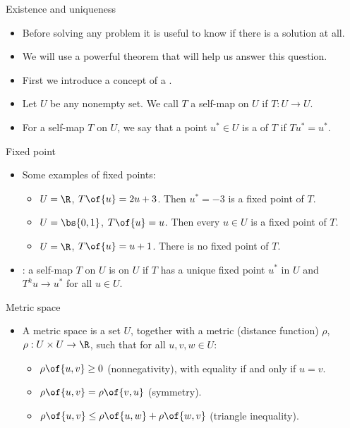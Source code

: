 \documentclass[11pt,xcolor={dvipsnames},aspectratio=159,hyperref={pdftex,pdfpagemode=UseNone,hidelinks,pdfdisplaydoctitle=true},usepdftitle=false]{beamer}
\begin{document}
\begin{frame}
\end{frame}


\begin{frame}{Existence and uniqueness}
    \begin{itemize}
        \item Before solving any problem it is useful to know if there is a solution at all.
        \item We will use a powerful theorem that will help us answer this question. 
        \item First we introduce a concept of a .
        \item Let $U$ be any nonempty set. We call $T$ a self-map on $U$ if $T: U \to U$.
        \item For a self-map $T$ on $U$, we say that a point $u^*\in U$ is a  of $T$ if $Tu^* = u^*$.
    \end{itemize}
\end{frame}

\begin{frame}{Fixed point}
    \begin{itemize}
        \item Some examples of fixed points: 
        \begin{itemize}
        \item  $U = \R$, $T\of{u} = 2u + 3$. Then $u^* = -3$ is a fixed point of $T$.
        \item  $U = \bs{0,1}$, $T\of{u} = u$. Then every $u \in U$ is a fixed point of $T$.    
        \item  $U = \R$, $T\of{u} = u + 1$. There is no fixed point of $T$.
        \end{itemize}
        \item {}: a self-map $T$ on $U$ is  on $U$ if $T$ has a unique fixed point $u^*$ in $U$ and $T^k u \to u^*$ for all $u \in U$. 
    \end{itemize}
\end{frame}

\begin{frame}{Metric space}
    \begin{itemize}
        \item A metric space is a set $U$, together with a metric (distance function) $\rho$, $\rho: U \times U \to \R$, such that for all $u,v,w \in U$:
        \begin{itemize}
            \item $\rho\of{u,v} \geq 0$ (nonnegativity), with equality if and only if $u=v$.
            \item $\rho\of{u,v} = \rho\of{v,u}$ (symmetry).
            \item $\rho\of{u,v} \leq \rho\of{u,w} + \rho\of{w,v}$ (triangle inequality).
        \end{itemize}
    \end{itemize}
\end{frame}
\end{document}
